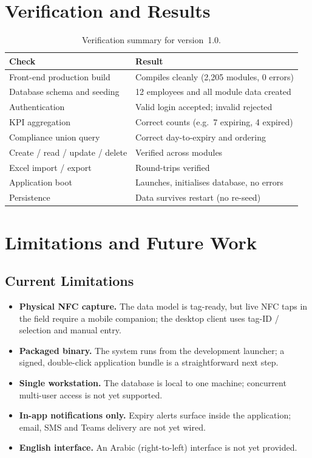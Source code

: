 \documentclass[11pt]{article}
\begin{document}
\section{Verification and Results}
\begin{table}[H]
\centering\small
\begin{tabular}{@{}l l@{}}
\toprule
\textbf{Check} & \textbf{Result} \\
\midrule
Front-end production build            & Compiles cleanly (2{,}205 modules, 0 errors) \\
Database schema and seeding           & 12 employees and all module data created \\
Authentication                        & Valid login accepted; invalid rejected \\
KPI aggregation                        & Correct counts (e.g.\ 7 expiring, 4 expired) \\
Compliance union query                 & Correct day-to-expiry and ordering \\
Create / read / update / delete        & Verified across modules \\
Excel import / export                  & Round-trips verified \\
Application boot                       & Launches, initialises database, no errors \\
Persistence                            & Data survives restart (no re-seed) \\
\bottomrule
\end{tabular}
\caption{Verification summary for version~1.0.}
\end{table}

\section{Limitations and Future Work}\label{sec:future}
\subsection{Current Limitations}
\begin{itemize}
  \item \textbf{Physical NFC capture.} The data model is tag-ready, but live NFC taps in the field require
        a mobile companion; the desktop client uses tag-ID / selection and manual entry.
  \item \textbf{Packaged binary.} The system runs from the development launcher; a signed, double-click
        application bundle is a straightforward next step.
  \item \textbf{Single workstation.} The database is local to one machine; concurrent multi-user access
        is not yet supported.
  \item \textbf{In-app notifications only.} Expiry alerts surface inside the application; email, SMS and
        Teams delivery are not yet wired.
  \item \textbf{English interface.} An Arabic (right-to-left) interface is not yet provided.
\end{itemize}
\end{document}

